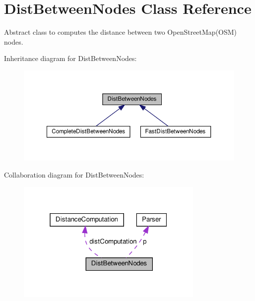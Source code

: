 \hypertarget{classDistBetweenNodes}{}\section{Dist\+Between\+Nodes Class Reference}
\label{classDistBetweenNodes}


Abstract class to computes the distance between two Open\+Street\+Map(\+O\+S\+M) nodes.  




Inheritance diagram for Dist\+Between\+Nodes\+:\nopagebreak
\begin{figure}[H]
\begin{center}
\leavevmode
\includegraphics[width=350pt]{classDistBetweenNodes__inherit__graph}
\end{center}
\end{figure}


Collaboration diagram for Dist\+Between\+Nodes\+:\nopagebreak
\begin{figure}[H]
\begin{center}
\leavevmode
\includegraphics[width=256pt]{classDistBetweenNodes__coll__graph}
\end{center}
\end{figure}

